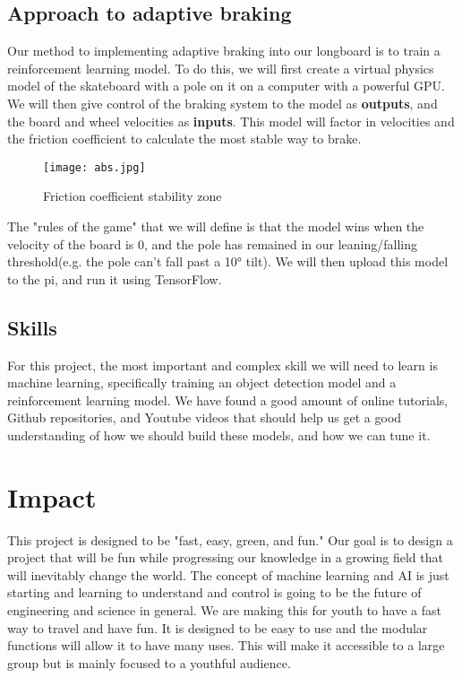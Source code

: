 \documentclass{article}
\begin{document}
\subsection{Approach to adaptive braking}
Our method to implementing adaptive braking into our longboard is to train a reinforcement learning model. To do this, we will first create a virtual physics model of the skateboard with a pole on it on a computer with a powerful GPU. We will then give control of the braking system to the model as \textbf{outputs}, and the board and wheel velocities as \textbf{inputs}. This model will factor in velocities and the friction coefficient to calculate the most stable way to brake.
\begin{figure}[ht]
\centering
\texttt{[image: abs.jpg]}
\caption{Friction coefficient stability zone}
\label{fig}
\end{figure}

The "rules of the game" that we will define is that the model wins when the velocity of the board is 0, and the pole has remained in our leaning/falling threshold(e.g. the pole can't fall past a 10° tilt). We will then upload this model to the pi, and run it using TensorFlow.
\subsection{Skills}
For this project, the most important and complex skill we will need to learn is machine learning, specifically training an object detection model and a reinforcement learning model. We have found a good amount of online tutorials, Github repositories, and Youtube videos that should help us get a good understanding of how we should build these models, and how we can tune it.

\section{Impact}
This project is designed to be "fast, easy, green, and fun." Our goal is to design a project that will be fun while progressing our knowledge in a growing field that will inevitably change the world. The concept of machine learning and AI is just starting and learning to understand and control is going to be the future of engineering and science in general. We are making this for youth to have a fast way to travel and have fun. It is designed to be easy to use and the modular functions will allow it to have many uses. This will make it accessible to a large group but is mainly focused to a youthful audience.
\end{document}
